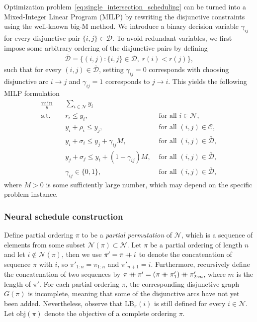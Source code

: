 \documentclass{article}
\newcommand\mdoubleplus{\mathbin{+\mkern-10mu+}}
\theoremstyle{definition}
\theoremstyle{plain}
\begin{document}
Optimization problem~\eqref{eq:single_intersection_scheduling} can be turned into
a Mixed-Integer Linear Program (MILP) by rewriting the disjunctive constraints using
the well-known big-M method.
%
We introduce a binary decision variable $\gamma_{ij}$ for every
disjunctive pair $\{i, j\} \in \mathcal{D}$.
%
To avoid redundant variables, we first impose some arbitrary ordering of the
disjunctive pairs by defining
\begin{align*}
  \bar{\mathcal{D}} = \{ (i,j) : \{i,j\} \in \mathcal{D}, \; r(i) < r(j) \} ,
\end{align*}
such that for every $(i,j) \in \bar{\mathcal{D}}$, setting $\gamma_{ij} = 0$
corresponds with choosing disjunctive arc $i \rightarrow j$ and
$\gamma_{ij} = 1$ corresponds to $j \rightarrow i$. This yields the following
MILP formulation
%
\begin{align*}
  \min_{y} \quad & \sum_{i \in \mathcal{N}} y_{i} & \\
  \text{s.t.} \quad & r_{i} \leq y_{i}, & \text{ for all } i \in \mathcal{N} , \\
  & y_{i} + \rho_{i} \leq y_{j}, & \text{ for all } (i,j) \in \mathcal{C} , \label{eq:conjunctions} \\
  & y_{i} + \sigma_{i} \leq y_{j} + \gamma_{ij}M, & \text{ for all } (i,j) \in \bar{\mathcal{D}} , \\
  & y_{j} + \sigma_{j} \leq y_{i} + (1 - \gamma_{ij})M, & \text{ for all } (i,j) \in \bar{\mathcal{D}} , \\
  & \gamma_{ij} \in \{0, 1\}, & \text{ for all } (i,j) \in \bar{\mathcal{D}} ,
\end{align*}
where $M > 0$ is some sufficiently large number, which may depend on the
specific problem instance.


\subsubsection{Neural schedule construction}

Define partial ordering $\pi$ to be a \textit{partial permutation} of
$\mathcal{N}$, which is a sequence of elements from some subset
$\mathcal{N}(\pi) \subset \mathcal{N}$.
%
Let $\pi$ be a partial ordering of length $n$ and let
$i \notin \mathcal{N}(\pi)$, then we use $\pi' = \pi \mdoubleplus i$ to denote
the concatenation of sequence $\pi$ with $i$, so $\pi'_{1:n} = \pi_{1:n}$ and
$\pi'_{n+1} = i$. Furthermore, recursively define the concatenation of two
sequences by
$\pi \mdoubleplus \pi' = ( \pi \mdoubleplus \pi'_{1} ) \mdoubleplus \pi'_{2:m}$,
where $m$ is the length of $\pi'$.
%
For each partial ordering $\pi$, the corresponding disjunctive graph $G(\pi)$ is
incomplete, meaning that some of the disjunctive arcs have not yet been added.
Nevertheless, observe that $\text{LB}_{\pi}(i)$ is still defined for every
$i \in \mathcal{N}$.
%
Let $\text{obj}(\pi)$ denote the objective of a complete ordering $\pi$.
\end{document}

